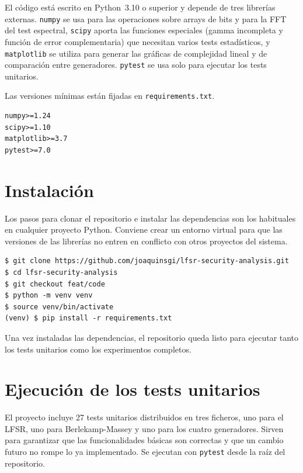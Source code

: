 El código está escrito en Python~3.10 o superior y depende de tres librerías externas.
\texttt{numpy} se usa para las operaciones sobre arrays de bits y para la FFT del test espectral,
\texttt{scipy} aporta las funciones especiales (gamma incompleta y función de error complementaria)
que necesitan varios tests estadísticos, y \texttt{matplotlib} se utiliza para generar las gráficas de complejidad lineal
y de comparación entre generadores. \texttt{pytest} se usa solo para ejecutar los tests unitarios.

Las versiones mínimas están fijadas en \texttt{requirements.txt}.

\begin{lstlisting}[basicstyle=\small\ttfamily,frame=single,backgroundcolor=\color{gray97},numbers=none]
numpy>=1.24
scipy>=1.10
matplotlib>=3.7
pytest>=7.0
\end{lstlisting}

\section{Instalación}

Los pasos para clonar el repositorio e instalar las dependencias son los habituales en cualquier proyecto Python.
Conviene crear un entorno virtual para que las versiones de las librerías no entren en conflicto con otros proyectos del sistema.

\begin{lstlisting}[style=Terminal]
$ git clone https://github.com/joaquinsgi/lfsr-security-analysis.git
$ cd lfsr-security-analysis
$ git checkout feat/code
$ python -m venv venv
$ source venv/bin/activate
(venv) $ pip install -r requirements.txt
\end{lstlisting}

Una vez instaladas las dependencias, el repositorio queda listo para ejecutar tanto los tests unitarios
como los experimentos completos.

\section{Ejecución de los tests unitarios}

El proyecto incluye 27 tests unitarios distribuidos en tres ficheros, uno para el LFSR, uno para Berlekamp-Massey y uno para los cuatro generadores.
Sirven para garantizar que las funcionalidades básicas son correctas y que un cambio futuro no rompe lo ya implementado.
Se ejecutan con \texttt{pytest} desde la raíz del repositorio.

